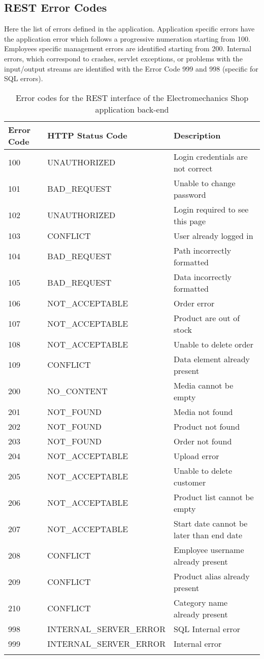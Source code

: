 \subsection{REST Error Codes}

Here the list of errors defined in the application. Application specific errors have the application error which follows a progressive numeration starting from 100. Employees specific management errors are identified starting from 200. Internal errors, which correspond to crashes, servlet exceptions, or problems with the input/output streams are identified with the Error Code 999 and 998 (specific for SQL errors).

\begin{longtable}{|p{}|p{}|p{}|}
\hline
\textbf{Error Code} & \textbf{HTTP Status Code} & \textbf{Description} \\\hline

100 & UNAUTHORIZED & Login credentials are not correct \\\hline
101 & BAD\_REQUEST & Unable to change password \\\hline
102 & UNAUTHORIZED & Login required to see this page \\\hline
103 & CONFLICT & User already logged in \\\hline
104 & BAD\_REQUEST & Path incorrectly formatted \\\hline
105 & BAD\_REQUEST & Data incorrectly formatted \\\hline
106 & NOT\_ACCEPTABLE & Order error \\\hline
107 & NOT\_ACCEPTABLE & Product are out of stock \\\hline
108 & NOT\_ACCEPTABLE & Unable to delete order \\\hline
109 & CONFLICT & Data element already present \\\hline

200 & NO\_CONTENT & Media cannot be empty \\\hline
201 & NOT\_FOUND & Media not found \\\hline
202 & NOT\_FOUND & Product not found \\\hline
203 & NOT\_FOUND & Order not found \\\hline
204 & NOT\_ACCEPTABLE & Upload error \\\hline
205 & NOT\_ACCEPTABLE & Unable to delete customer \\\hline
206 & NOT\_ACCEPTABLE & Product list cannot be empty \\\hline
207 & NOT\_ACCEPTABLE & Start date cannot be later than end date \\\hline
208 & CONFLICT & Employee username already present \\\hline
209 & CONFLICT & Product alias already present \\\hline
210 & CONFLICT & Category name already present \\\hline

998 & INTERNAL\_SERVER\_ERROR & SQL Internal error \\\hline
999 & INTERNAL\_SERVER\_ERROR & Internal error \\\hline

\caption{Error codes for the REST interface of the Electromechanics Shop application back-end}
\label{tab:ErrorRest}
\end{longtable}